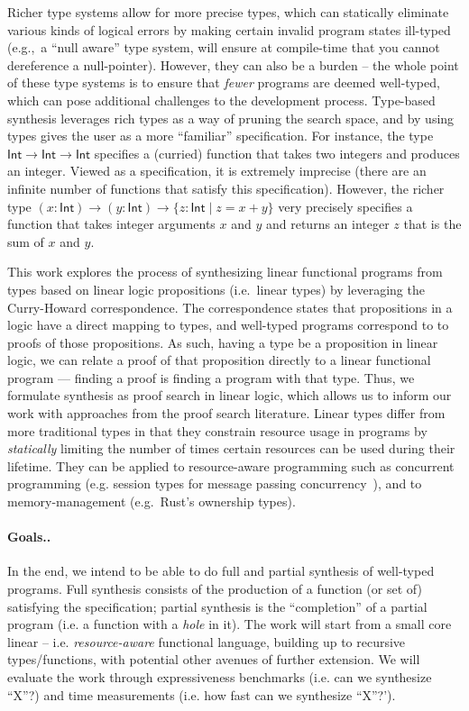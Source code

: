 \documentclass{llncs}
\newcommand{\mypara}[1]{\paragraph{\textbf{#1}.}}
\begin{document}
Richer type systems allow for more precise types, which can
statically eliminate various kinds of logical errors by making certain
invalid program states ill-typed (e.g.,~a ``null aware'' type system,
will ensure at compile-time that you cannot dereference a
null-pointer). However, they can also be a burden -- the whole point
of these type systems is to ensure that \emph{fewer} programs are
deemed well-typed, which can pose additional challenges to the
development process. Type-based synthesis leverages rich types as a
way of pruning the search space, and by using types gives the user as
a more ``familiar'' specification. For instance, the type
$\mathsf{Int} \rightarrow \mathsf{Int} \rightarrow \mathsf{Int}$
specifies a (curried) function that takes two integers and produces an
integer. Viewed as a specification, it is extremely imprecise (there
are an infinite number of functions that satisfy this specification).
However, the richer type $(x{:}\mathsf{Int}) \rightarrow
(y{:}\mathsf{Int}) \rightarrow \{z{:}\mathsf{Int} \mid z = x+y\}$
very precisely specifies a function that takes integer arguments $x$
and $y$ and returns an integer $z$ that is the sum of $x$ and $y$. 


%
This work explores the process of synthesizing linear functional
programs from types based on linear logic propositions (i.e.~linear
types) by leveraging the Curry-Howard correspondence.  The
correspondence states that propositions in a logic have a direct
mapping to types, and well-typed programs correspond to to proofs of
those propositions.  As such, having a type be a proposition in linear
logic, we can relate a proof of that proposition directly to a linear
functional program — finding a proof is finding a program with that
type. Thus, we formulate synthesis as proof search in linear logic,
which allows us to inform our work with approaches from the proof
search literature.  Linear types differ from more traditional types in
that they constrain resource usage in programs by \emph{statically}
limiting the number of times certain resources can be used during
their lifetime.  They can be applied to resource-aware programming
such as concurrent programming (e.g. session types for message passing
concurrency~\cite{}), and to memory-management (e.g.~Rust's ownership
types).

\mypara{Goals.}
In the end, we intend to be able to do full and partial synthesis of
well-typed programs. Full synthesis consists of the production of a
function (or set of) satisfying the specification; partial synthesis
is the ``completion'' of a partial program (i.e. a function with a
\emph{hole} in it). The work will start from a small core linear --
i.e. \emph{resource-aware} functional language, building up to
recursive types/functions, with potential other avenues of further
extension. 
%
We will evaluate the work through
expressiveness benchmarks (i.e. can we synthesize ``X''?) and time
measurements (i.e. how fast can we synthesize ``X''?').
\end{document}
